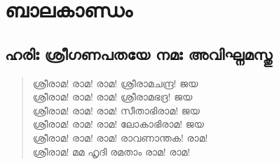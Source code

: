 \chapter{ബാലകാണ്ഡം}

\section{ഹരിഃ ശ്രീഗണപതയേ നമഃ അവിഘ്നമസ്തു}

\begin{verse}
ശ്രീരാമ! രാമ! രാമ! ശ്രീരാമചന്ദ്ര! ജയ\\
ശ്രീരാമ! രാമ! രാമ! ശ്രീരാമഭദ്ര! ജയ\\
ശ്രീരാമ! രാമ! രാമ! സീതാഭിരാമ! ജയ\\
ശ്രീരാമ! രാമ! രാമ! ലോകാഭിരാമ! ജയ\\
ശ്രീരാമ! രാമ! രാമ! രാവണാന്തക! രാമ!\\
ശ്രീരാമ! മമ ഹൃദി രമതാം രാമ! രാമ!
\end{verse}

